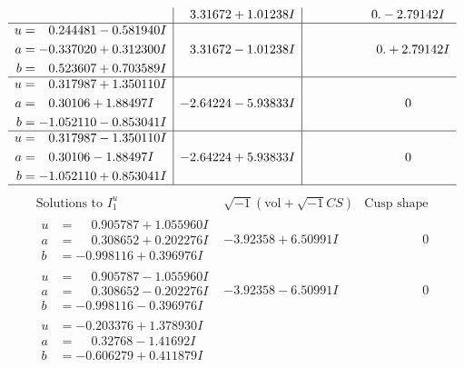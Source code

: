 \documentclass[1p]{elsarticle_modified}
\theoremstyle{definition}
\newcommand{\I}{\sqrt{-1}}
\begin{document}
$$\begin{array}{c|c|c}
 & \phantom{-}3.31672 + 1.01238 I & \phantom{-0.000000 } 0. - 2.79142 I \\ \hline\begin{aligned}
u &= \phantom{-}0.244481 - 0.581940 I \\
a &= -0.337020 + 0.312300 I \\
b &= \phantom{-}0.523607 + 0.703589 I\end{aligned}
 & \phantom{-}3.31672 - 1.01238 I & \phantom{-0.000000 -}0. + 2.79142 I \\ \hline\begin{aligned}
u &= \phantom{-}0.317987 + 1.350110 I \\
a &= \phantom{-}0.30106 + 1.88497 I \\
b &= -1.052110 - 0.853041 I\end{aligned}
 & -2.64224 - 5.93833 I & \phantom{-0.000000 } 0 \\ \hline\begin{aligned}
u &= \phantom{-}0.317987 - 1.350110 I \\
a &= \phantom{-}0.30106 - 1.88497 I \\
b &= -1.052110 + 0.853041 I\end{aligned}
 & -2.64224 + 5.93833 I & \phantom{-0.000000 } 0\\
 \hline 
 \end{array}$$\newpage$$\begin{array}{c|c|c}  
\text{Solutions to }I^u_{1}& \I (\text{vol} + \sqrt{-1}CS) & \text{Cusp shape}\\
 \hline 
\begin{aligned}
u &= \phantom{-}0.905787 + 1.055960 I \\
a &= \phantom{-}0.308652 + 0.202276 I \\
b &= -0.998116 + 0.396976 I\end{aligned}
 & -3.92358 + 6.50991 I & \phantom{-0.000000 } 0 \\ \hline\begin{aligned}
u &= \phantom{-}0.905787 - 1.055960 I \\
a &= \phantom{-}0.308652 - 0.202276 I \\
b &= -0.998116 - 0.396976 I\end{aligned}
 & -3.92358 - 6.50991 I & \phantom{-0.000000 } 0 \\ \hline\begin{aligned}
u &= -0.203376 + 1.378930 I \\
a &= \phantom{-}0.32768 - 1.41692 I \\
b &= -0.606279 + 0.411879 I\end{aligned}

\end{array}$$
\end{document}
